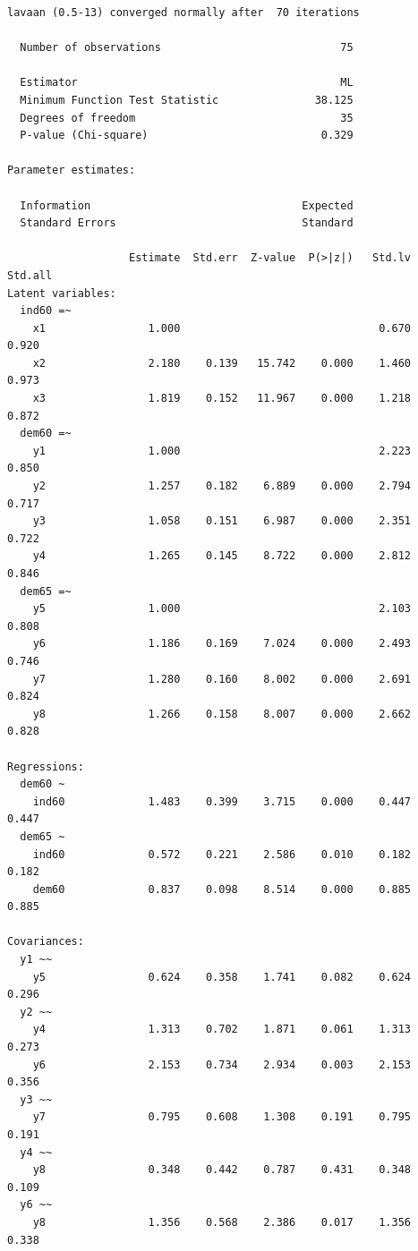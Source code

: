 \begin{verbatim}
lavaan (0.5-13) converged normally after  70 iterations

  Number of observations                            75

  Estimator                                         ML
  Minimum Function Test Statistic               38.125
  Degrees of freedom                                35
  P-value (Chi-square)                           0.329

Parameter estimates:

  Information                                 Expected
  Standard Errors                             Standard

                   Estimate  Std.err  Z-value  P(>|z|)   Std.lv  Std.all
Latent variables:
  ind60 =~
    x1                1.000                               0.670    0.920
    x2                2.180    0.139   15.742    0.000    1.460    0.973
    x3                1.819    0.152   11.967    0.000    1.218    0.872
  dem60 =~
    y1                1.000                               2.223    0.850
    y2                1.257    0.182    6.889    0.000    2.794    0.717
    y3                1.058    0.151    6.987    0.000    2.351    0.722
    y4                1.265    0.145    8.722    0.000    2.812    0.846
  dem65 =~
    y5                1.000                               2.103    0.808
    y6                1.186    0.169    7.024    0.000    2.493    0.746
    y7                1.280    0.160    8.002    0.000    2.691    0.824
    y8                1.266    0.158    8.007    0.000    2.662    0.828

Regressions:
  dem60 ~
    ind60             1.483    0.399    3.715    0.000    0.447    0.447
  dem65 ~
    ind60             0.572    0.221    2.586    0.010    0.182    0.182
    dem60             0.837    0.098    8.514    0.000    0.885    0.885

Covariances:
  y1 ~~
    y5                0.624    0.358    1.741    0.082    0.624    0.296
  y2 ~~
    y4                1.313    0.702    1.871    0.061    1.313    0.273
    y6                2.153    0.734    2.934    0.003    2.153    0.356
  y3 ~~
    y7                0.795    0.608    1.308    0.191    0.795    0.191
  y4 ~~
    y8                0.348    0.442    0.787    0.431    0.348    0.109
  y6 ~~
    y8                1.356    0.568    2.386    0.017    1.356    0.338


\end{verbatim}
